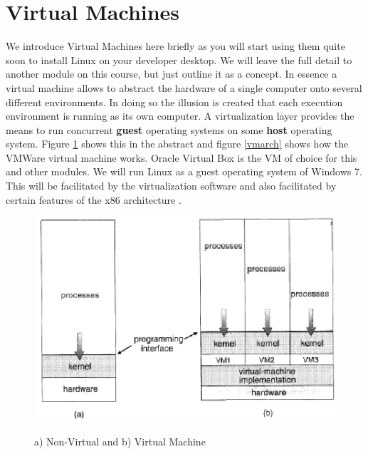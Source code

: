 \documentclass[10pt,a4paper]{article}
\begin{document}
\section{Virtual Machines}
We introduce Virtual Machines here briefly as you will start using them quite soon to install Linux on your developer desktop. We will leave the full detail to another module on this course, but just outline it as a concept. In essence a virtual machine allows to abstract the hardware of a single computer onto several different environments. In doing so the illusion is created that each execution environment is running as its own computer. A virtualization layer provides the means to run concurrent {\bf guest} operating systems on some {\bf host} operating system. Figure \ref{virtualmachines} shows this in the abstract and figure \ref{vmarch} shows how the VMWare virtual machine works. Oracle Virtual Box \cite{VIRTUALBOX} is the VM of choice for this and other modules. We will run Linux as a guest operating system of Windows 7. This will be facilitated by the virtualization software and also facilitated by certain features of the x86 architecture \cite{INTELSWDEV}.
\begin{figure}
\caption{a) Non-Virtual and b) Virtual Machine \cite{OSCONCEPTS}}
\begin{center}
\includegraphics[scale=0.45]{../images/virtual-machine.png}
\label{virtualmachines}
\end{center}
\end{figure}
\end{document}
